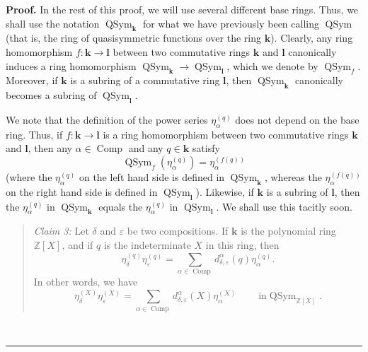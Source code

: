 \documentclass[numbers=enddot,12pt,final,onecolumn,notitlepage]{scrartcl}%
\theoremstyle{definition}
\newenvironment{statement}{\begin{quote}}{\end{quote}}
\newenvironment{proof}[1][Proof]{\noindent\textbf{#1.} }{\ \rule{0.5em}{0.5em}}
\let\sumnonlimits\sum
\renewcommand{\sum}{\sumnonlimits\limits}
\begin{document}
\begin{proof}
In the rest of this proof, we will use several different base rings. Thus, we
shall use the notation $\operatorname*{QSym}\nolimits_{\mathbf{k}}$ for what
we have previously been calling $\operatorname*{QSym}$ (that is, the ring of
quasisymmetric functions over the ring $\mathbf{k}$). Clearly, any ring
homomorphism $f:\mathbf{k}\rightarrow\mathbf{l}$ between two commutative rings
$\mathbf{k}$ and $\mathbf{l}$ canonically induces a ring homomorphism
$\operatorname*{QSym}\nolimits_{\mathbf{k}}\rightarrow\operatorname*{QSym}%
\nolimits_{\mathbf{l}}$, which we denote by $\operatorname*{QSym}%
\nolimits_{f}$. Moreover, if $\mathbf{k}$ is a subring of a commutative ring
$\mathbf{l}$, then $\operatorname*{QSym}\nolimits_{\mathbf{k}}$ canonically
becomes a subring of $\operatorname*{QSym}\nolimits_{\mathbf{l}}$.

We note that the definition of the power series $\eta_{\alpha}^{\left(
q\right)  }$ does not depend on the base ring. Thus, if $f:\mathbf{k}%
\rightarrow\mathbf{l}$ is a ring homomorphism between two commutative rings
$\mathbf{k}$ and $\mathbf{l}$, then any $\alpha\in\operatorname*{Comp}$ and
any $q\in\mathbf{k}$ satisfy%
\begin{equation}
\operatorname*{QSym}\nolimits_{f}\left(  \eta_{\alpha}^{\left(  q\right)
}\right)  =\eta_{\alpha}^{\left(  f\left(  q\right)  \right)  }
\label{pf.thm.product.feta}%
\end{equation}
(where the $\eta_{\alpha}^{\left(  q\right)  }$ on the left hand side is
defined in $\operatorname*{QSym}\nolimits_{\mathbf{k}}$, whereas the
$\eta_{\alpha}^{\left(  f\left(  q\right)  \right)  }$ on the right hand side
is defined in $\operatorname*{QSym}\nolimits_{\mathbf{l}}$). Likewise, if
$\mathbf{k}$ is a subring of $\mathbf{l}$, then the $\eta_{\alpha}^{\left(
q\right)  }$ in $\operatorname*{QSym}\nolimits_{\mathbf{k}}$ equals the
$\eta_{\alpha}^{\left(  q\right)  }$ in $\operatorname*{QSym}%
\nolimits_{\mathbf{l}}$. We shall use this tacitly soon.

\begin{statement}
\textit{Claim 3:} Let $\delta$ and $\varepsilon$ be two compositions. If
$\mathbf{k}$ is the polynomial ring $\mathbb{Z}\left[  X\right]  $, and if $q$
is the indeterminate $X$ in this ring, then%
\[
\eta_{\delta}^{\left(  q\right)  }\eta_{\varepsilon}^{\left(  q\right)  }%
=\sum_{\alpha\in\operatorname*{Comp}}d_{\delta,\varepsilon}^{\alpha}\left(
q\right)  \eta_{\alpha}^{\left(  q\right)  }.
\]
In other words, we have
\begin{equation}
\eta_{\delta}^{\left(  X\right)  }\eta_{\varepsilon}^{\left(  X\right)  }%
=\sum_{\alpha\in\operatorname*{Comp}}d_{\delta,\varepsilon}^{\alpha}\left(
X\right)  \eta_{\alpha}^{\left(  X\right)  }\ \ \ \ \ \ \ \ \ \ \text{in
}\operatorname*{QSym}\nolimits_{\mathbb{Z}\left[  X\right]  }.
\label{pf.thm.product.c3.equiv}%
\end{equation}


\end{statement}
\end{proof}
\end{document}
